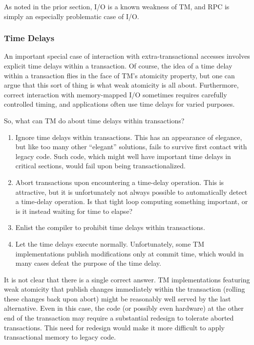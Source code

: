 As noted in the prior section, I/O is a known weakness of TM, and RPC
is simply an especially problematic case of I/O.

\subsubsection{Time Delays}
\label{sec:future:Time Delays}

An important special case of interaction with extra-transactional accesses
involves explicit time delays within a transaction.
Of course, the idea of a time delay within a transaction flies in the
face of TM's atomicity property, but one can argue that this sort of
thing is what weak atomicity is all about.
Furthermore, correct interaction with memory-mapped I/O sometimes requires
carefully controlled timing, and applications often use time delays
for varied purposes.

So, what can TM do about time delays within transactions?

\begin{enumerate}
\item	Ignore time delays within transactions.
	This has an appearance of elegance, but like too many other
	``elegant'' solutions, fails to survive first contact with
	legacy code.
	Such code, which might well have important time delays in critical
	sections, would fail upon being transactionalized.
\item	Abort transactions upon encountering a time-delay operation.
	This is attractive, but it is unfortunately not always possible
	to automatically detect a time-delay operation.
	Is that tight loop computing something important, or is it
	instead waiting for time to elapse?
\item	Enlist the compiler to prohibit time delays within transactions.
\item	Let the time delays execute normally.
	Unfortunately, some TM implementations publish modifications only
	at commit time, which would in many cases defeat the purpose of
	the time delay.
\end{enumerate}

It is not clear that there is a single correct answer.
TM implementations featuring weak atomicity that publish changes
immediately within the transaction (rolling these changes back upon abort)
might be reasonably well served by the last alternative.
Even in this case, the code (or possibly even hardware) at the other
end of the transaction may require a substantial redesign to tolerate
aborted transactions.
This need for redesign would make it more difficult to apply transactional
memory to legacy code.

